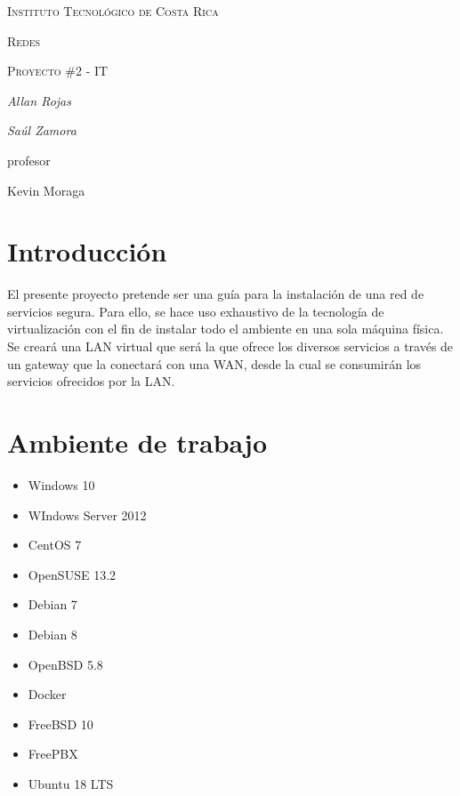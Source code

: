 \documentclass{article}
\begin{document}
\begin{titlepage}
  \centering
  {\scshape\LARGE Instituto Tecnol\'ogico de Costa Rica \par}
  \vspace{1cm}
  {\scshape\Large Redes\par}
  {\scshape\Large Proyecto \#2 - IT\par}
  \vspace{1.5cm}
  {\Large\itshape Allan Rojas\par}
  {\Large\itshape Sa\'ul Zamora\par}
  \vfill
  profesor\par
  Kevin Moraga \textsc{}

  \vfill

\end{titlepage}

\section{Introducci\'on}
El presente proyecto pretende ser una gu\'ia para la instalaci\'on de una red de servicios segura. Para ello, se hace uso exhaustivo de la tecnolog\'ia de virtualizaci\'on con el fin de instalar todo el ambiente en una sola m\'aquina f\'isica. Se crear\'a una LAN virtual que ser\'a la que ofrece los diversos servicios a trav\'es de un gateway que la conectar\'a con una WAN, desde la cual se consumir\'an los servicios ofrecidos por la LAN.

\section{Ambiente de trabajo}
\begin{itemize}
  \item Windows 10
  \item WIndows Server 2012
  \item CentOS 7
  \item OpenSUSE 13.2
  \item Debian 7
  \item Debian 8
  \item OpenBSD 5.8
  \item Docker
  \item FreeBSD 10
  \item FreePBX
  \item Ubuntu 18 LTS
\end{itemize}
\end{document}
